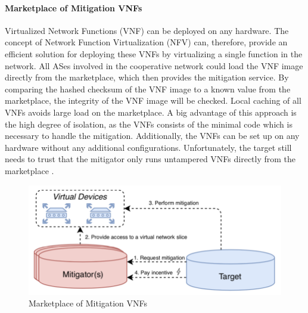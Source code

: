 \paragraph{Marketplace of Mitigation VNFs}
Virtualized  Network Functions (VNF) can be deployed on any hardware. The concept of Network Function Virtualization (NFV) can, therefore, provide an efficient solution for deploying these VNFs by virtualizing a single function in the network. All ASes involved in the cooperative network could load the VNF image directly from the marketplace, which then provides the mitigation service. By comparing the hashed checksum of the VNF image to a known value from the marketplace, the integrity of the VNF image will be checked. Local caching of all VNFs avoids large load on the marketplace. A big advantage of this approach is the high degree of isolation, as the VNFs consists of the minimal code which is necessary to handle the mitigation. Additionally, the VNFs can be set up on any hardware without any additional configurations. Unfortunately, the target still needs to trust that the mitigator only runs untampered VNFs directly from the marketplace \cite{Mannhart2018}.
\begin{figure}[ht]
  \begin{center}
  \includegraphics[scale=0.5]{Talk7/img/ddos/cooperative_network_marketplace_vnfs}
  \end{center}
  \caption{Marketplace of Mitigation VNFs}
  \label{ddos_marketplace_vnf}
\end{figure}

